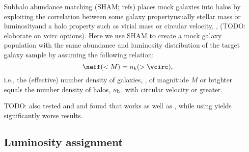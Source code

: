 \documentclass[twocolumn,apj,iop,tighten]{emulateapj2}
\begin{document}
Subhalo abundance matching (SHAM; refs) places mock galaxies into halos by exploiting the correlation between some galaxy property\textemdash usually stellar mass or luminosity\textemdash and a halo property such as virial mass or circular velocity, \vcirc, (TODO: elaborate on vcirc options). Here we use SHAM to create a mock galaxy population with the same abundance and luminosity distribution of the target galaxy sample by assuming the following relation:
%
\begin{equation}\label{eq:sham}
\neff(<M)=n_{\rm h}(>\vcirc),
\end{equation}
%
\noindent i.e., the (effective) number density of galaxies, \neff, of magnitude $M$ or brighter equals the number density of halos, $n_{\rm h}$, with circular velocity \vcirc or greater.

TODO: also tested \vmax and \vmaxmpeak and found that \vmaxmpeak works as well as \vpeak, while using \vmax yields significantly worse results.

\subsection{Luminosity assignment}\label{subsec:luminosity_assign}
\end{document}
